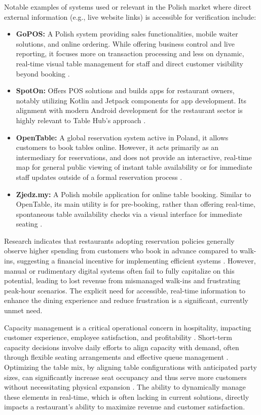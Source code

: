 \documentclass{article}
\begin{document}
Notable examples of systems used or relevant in the Polish market where direct external information (e.g., live website links) is accessible for verification include:
\begin{itemize}
    \item \textbf{GoPOS:} A Polish system providing sales functionalities, mobile waiter solutions, and online ordering. While offering business control and live reporting, it focuses more on transaction processing and less on dynamic, real-time visual table management for staff and direct customer visibility beyond booking \parencite{gopos}.
    \item \textbf{SpotOn:} Offers POS solutions and builds apps for restaurant owners, notably utilizing Kotlin and Jetpack components for app development. Its alignment with modern Android development for the restaurant sector is highly relevant to Table Hub's approach \parencite{spoton}.
    \item \textbf{OpenTable:} A global reservation system active in Poland, it allows customers to book tables online. However, it acts primarily as an intermediary for reservations, and does not provide an interactive, real-time map for general public viewing of instant table availability or for immediate staff updates outside of a formal reservation process \parencite{opentable}.
    \item \textbf{Zjedz.my:} A Polish mobile application for online table booking. Similar to OpenTable, its main utility is for pre-booking, rather than offering real-time, spontaneous table availability checks via a visual interface for immediate seating \parencite{zjedzmy}.
\end{itemize}

Research indicates that restaurants adopting reservation policies generally observe higher spending from customers who book in advance compared to walk-ins, suggesting a financial incentive for implementing efficient systems \parencite{gregorash2016restaurant}. However, manual or rudimentary digital systems often fail to fully capitalize on this potential, leading to lost revenue from mismanaged walk-ins and frustrating peak-hour scenarios. The explicit need for accessible, real-time information to enhance the dining experience and reduce frustration is a significant, currently unmet need.

Capacity management is a critical operational concern in hospitality, impacting customer experience, employee satisfaction, and profitability \parencite{pullman2010capacity}. Short-term capacity decisions involve daily efforts to align capacity with demand, often through flexible seating arrangements and effective queue management \parencite{pullman2010capacity}. Optimizing the table mix, by aligning table configurations with anticipated party sizes, can significantly increase seat occupancy and thus serve more customers without necessitating physical expansion \parencite{kim2020small}. The ability to dynamically manage these elements in real-time, which is often lacking in current solutions, directly impacts a restaurant's ability to maximize revenue and customer satisfaction.
\end{document}
